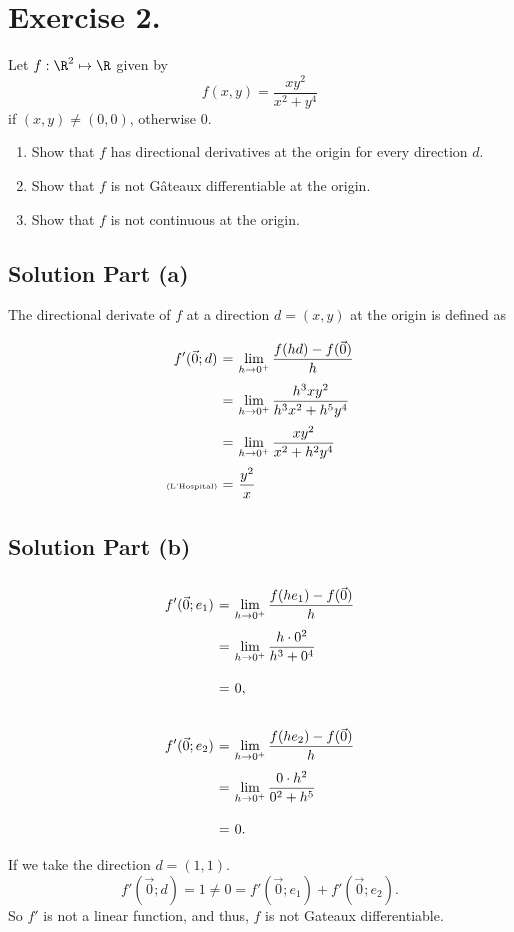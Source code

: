 \section*{Exercise 2.}

Let $f : \R^2 \mapsto \R$ given by
\[ f(x,y) = \frac{xy^2}{x^2+y^4} \]
if $(x,y) \neq (0,0)$, otherwise $0$.

\begin{enumerate}[label=\alph*)]
    \item Show that $f$ has directional derivatives at the origin for every direction $d$.
    \item Show that $f$ is not Gâteaux differentiable at the origin.
    \item Show that $f$ is not continuous at the origin.
\end{enumerate}

\subsection*{Solution Part (a)}
The directional derivate of $f$ at a direction $d = (x,y)$ at the origin is defined as
\[ \everymath{\displaystyle}
\arraycolsep=1.8pt\def\arraystretch{2.5}
\begin{array}{rcl}
    f'(\vec{0}; d) & = & \lim_{h \to 0^+} \frac{f(hd)- f(\vec{0})}{h}\\
    & = & \lim_{h \to 0^+} \frac{h^3 xy^2}{h^3x^2+ h^5y^4}\\
    & = & \lim_{h \to 0^+} \frac{xy^2}{x^2 + h^2 y^{4}}\\
    \mbox{\tiny{(L'Hospital)}} & = & \frac{y^2}{x}
\end{array}  \]

\subsection*{Solution Part (b)}
\[ \everymath{\displaystyle}
\arraycolsep=1.8pt\def\arraystretch{2.5}
\begin{array}{rcl}
    f'(\vec{0}; e_1) & = & \lim_{h \to 0^+} \frac{f(he_1)- f(\vec{0})}{h}\\
    & = & \lim_{h \to 0^+} \frac{h\cdot 0^2}{h^3+ 0^4}\\
    & = & 0,
\end{array}  \]

\[ \everymath{\displaystyle}
\arraycolsep=1.8pt\def\arraystretch{2.5}
\begin{array}{rcl}
    f'(\vec{0}; e_2) & = & \lim_{h \to 0^+} \frac{f(he_2)- f(\vec{0})}{h}\\
    & = & \lim_{h \to 0^+} \frac{0\cdot h^2}{0^2+ h^5}\\
    & = & 0.
\end{array}  \]
If we take the direction $d = (1,1)$.
\[ f'(\vec{0};d) = 1 \neq 0 = f'(\vec{0};e_1) + f'(\vec{0};e_2).\]
So $f'$ is not a linear function, and thus, $f$ is not Gateaux differentiable.

